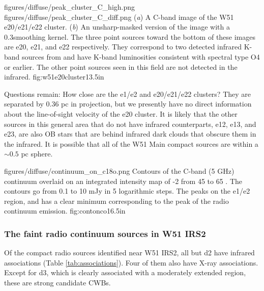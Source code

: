 \FigureTwo
{figures/diffuse/peak_cluster_C_high.png}
{figures/diffuse/peak_cluster_C_diff.png}
{({\it a}) A C-band image of the W51 e20/e21/e22 cluster.
({\it b}) An unsharp-masked version of the image with a 0.3\arcsec smoothing
kernel. 
The three point sources toward the bottom of these images are e20, e21, and e22
respectively.  They correspond to two detected infrared K-band sources from
\citet{Goldader1994a} and have K-band luminosities consistent with spectral
type O4 or earlier.  The other point sources seen in this field are not detected
in the infrared.
}
{fig:w51e20cluster}{1}{3.5in}


Questions remain: %
How close are the e1/e2 and e20/e21/e22 clusters?  They are separated by 0.36
pc in projection, but we presently have no direct information about the
line-of-sight velocity of the e20 cluster.    It is likely that the other
sources in this general area that do not have infrared counterparts, e12, e13,
and e23, are also OB stars that are behind infrared dark clouds that obscure
them in the infrared.  It is possible that all of the W51 Main compact sources
are within a $\sim 0.5$ pc sphere.


\Figure
{figures/diffuse/continuum_on_c18o.png}
{Contours of the C-band (5 GHz) continuum overlaid on an integrated intensity
map of -2 from 45 to 65 \kms \citep{Parsons2012a}.  The contours
go from 0.1 to 10 mJy in 5 logarithmic steps.  The \ceighteeno peaks on the
e1/e2 region, and has a clear minimum corresponding to the peak of the radio
continuum emission.
}
{fig:contonco}{1}{6.5in}

\subsubsection{The faint radio continuum sources in W51 IRS2}

Of the compact radio sources identified near W51 IRS2, all but d2 have infrared
associations (Table \ref{tab:associations}).  Four of them also have X-ray
associations.  Except for d3, which is clearly associated with a moderately
extended \hii region, these are strong candidate CWBs.

